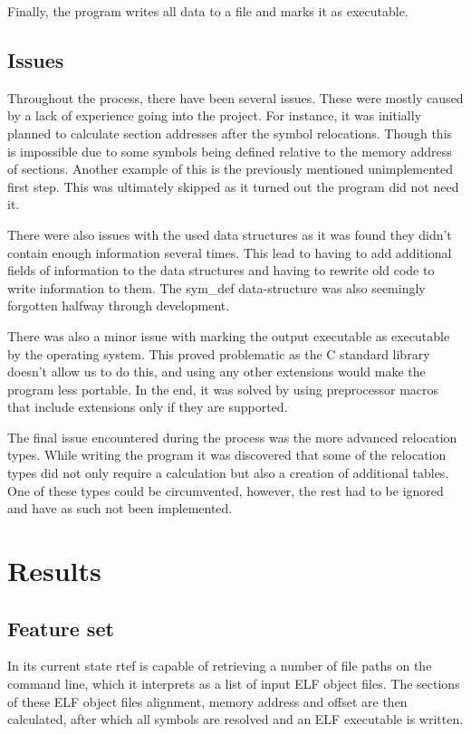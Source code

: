 \documentclass[notitlepage]{report}
\begin{document}
Finally, the program writes all data to a file and marks it as executable.

\subsection{Issues}

Throughout the process, there have been several issues. These were mostly caused by a lack of experience going into the project. For instance, it was initially planned to calculate section addresses after the symbol relocations. Though this is impossible due to some symbols being defined relative to the memory address of sections. Another example of this is the previously mentioned unimplemented first step. This was ultimately skipped as it turned out the program did not need it.

There were also issues with the used data structures as it was found they didn't contain enough information several times. This lead to having to add additional fields of information to the data structures and having to rewrite old code to write information to them. The sym\_def data-structure was also seemingly forgotten halfway through development.

There was also a minor issue with marking the output executable as executable by the operating system. This proved problematic as the C standard library doesn't allow us to do this, and using any other extensions would make the program less portable. In the end, it was solved by using preprocessor macros that include extensions only if they are supported.

The final issue encountered during the process was the more advanced relocation types. While writing the program it was discovered that some of the relocation types did not only require a calculation but also a creation of additional tables. One of these types could be circumvented, however, the rest had to be ignored and have as such not been implemented.

\section{Results}

\subsection{Feature set}

In its current state rtef is capable of retrieving a number of file paths on the command line, which it interprets as a list of input ELF object files. The sections of these ELF object files alignment, memory address and offset are then calculated, after which all symbols are resolved and an ELF executable is written.
\end{document}
